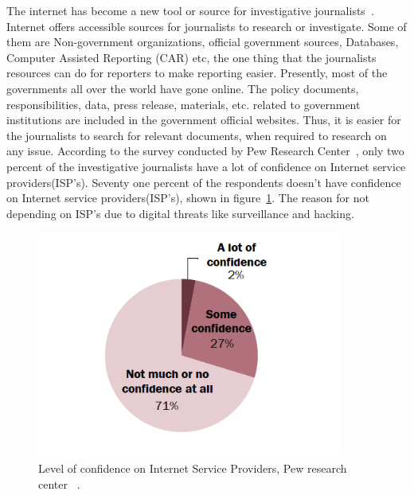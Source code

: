  The internet has become a new tool or source for investigative journalists~\cite{knight2001online}. Internet offers accessible sources for journalists to research or investigate. Some of them are Non-government organizations, official government sources, Databases, Computer Assisted Reporting (CAR) etc, the one thing that the journalists resources can do for reporters to make reporting easier. Presently, most of the governments all over the world have gone online. The policy documents, responsibilities, data, press release, materials, etc. related to government institutions are included in the government official websites. Thus, it is easier for the journalists to search for relevant documents, when required to research on any issue. According to the survey conducted by Pew Research Center~\cite{ia2p}, only two percent of the investigative journalists have a lot of confidence on Internet service providers(ISP's). Seventy one percent of the respondents doesn't have confidence on  Internet service providers(ISP's), shown in figure~\ref{fig:1}. The reason for not depending on ISP's due to digital threats like surveillance and hacking. ~\cite{ia2p} \\
 \begin{figure}[ht!]
 	\centering
 	\includegraphics[width=100mm]{2.png}
 	\caption{Level of confidence on Internet Service Providers, Pew research center ~\cite{ia2p}.}
 	\label{fig:1}
 \end{figure}


